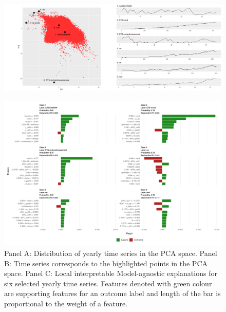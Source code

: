 \documentclass[11pt,a4paper,]{article}
\begin{document}
\clearpage

\begin{figure}[h]

{\centering \includegraphics{figures/yearlylime-1} 

}

\end{figure}

\begin{figure}[h]

{\centering \includegraphics{figures/yearlylime2-1} 

}

\caption{Panel A: Distribution of yearly time series in the PCA space. Panel B: Time series corresponds to the highlighted points in the PCA space. Panel C: Local interpretable Model-agnostic explanations for six selected yearly time series. Features denoted with green colour are supporting features for an outcome label and length of the bar is proportional to the weight of a feature.}\label{fig:yearlylime2}
\end{figure}

\clearpage
\end{document}
